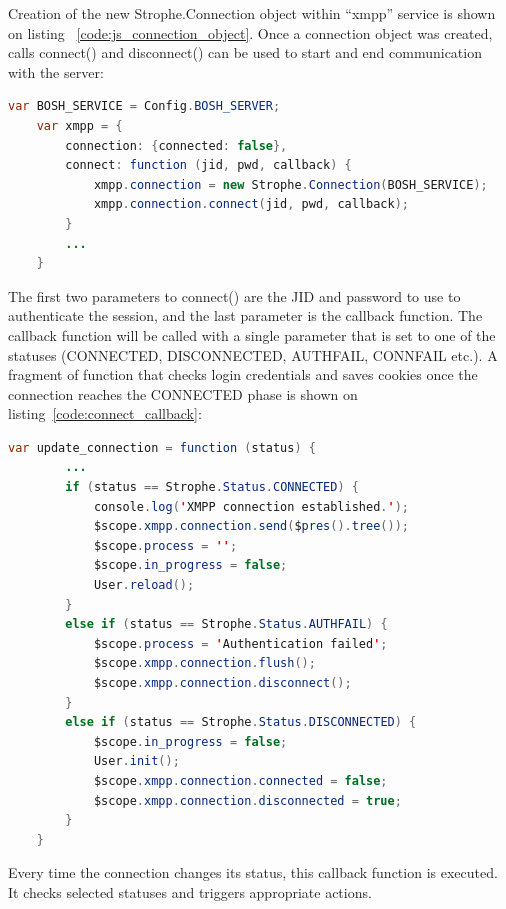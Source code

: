 Creation of the new Strophe.Connection object within ``xmpp'' service is shown on listing ~\ref{code:js_connection_object}. Once a connection object was created, calls connect() and disconnect() can be used to start and end communication with the server:

    \begin{lstlisting}[language=java,label=code:js_connection_object,caption=Sample code of connecting/disconnectiong to XMPP BOSH]
    var BOSH_SERVICE = Config.BOSH_SERVER;
    var xmpp = {
        connection: {connected: false},
		connect: function (jid, pwd, callback) {
            xmpp.connection = new Strophe.Connection(BOSH_SERVICE);
            xmpp.connection.connect(jid, pwd, callback);
        }
        ...
    }
    \end{lstlisting}

The first two parameters to connect() are the JID and password to use to authenticate the session, and the last parameter is the callback function. The callback function will be called with a single parameter that is set to one of the statuses (CONNECTED, DISCONNECTED, AUTHFAIL, CONNFAIL etc.). A fragment of function that checks login credentials and saves cookies once the connection reaches the CONNECTED phase is shown on listing~\ref{code:connect_callback}: 

\begin{lstlisting}[language=java,label=code:connect_callback,caption=Stanzas Format]
    var update_connection = function (status) {
        ...
        if (status == Strophe.Status.CONNECTED) {
            console.log('XMPP connection established.');
            $scope.xmpp.connection.send($pres().tree());
            $scope.process = '';
            $scope.in_progress = false;
            User.reload();
        }
        else if (status == Strophe.Status.AUTHFAIL) {
            $scope.process = 'Authentication failed';
            $scope.xmpp.connection.flush();
            $scope.xmpp.connection.disconnect();
        }
        else if (status == Strophe.Status.DISCONNECTED) {
            $scope.in_progress = false;
            User.init();
            $scope.xmpp.connection.connected = false;
            $scope.xmpp.connection.disconnected = true;
        }
    }
\end{lstlisting}

Every time the connection changes its status, this callback function is executed. It checks selected statuses and triggers appropriate actions.

